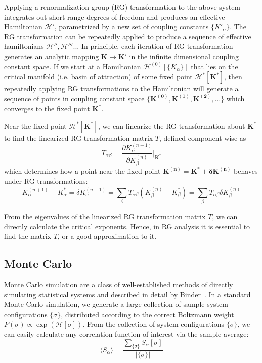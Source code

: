 \documentclass[12pt]{article}
\renewcommand{\vec}[1]{\mathbf{#1}}
\begin{document}
Applying a renormalization group (RG) transformation to the above system integrates out short range degrees of freedom and produces an effective Hamiltonian $\mathcal{H'}$, parametrized by a new set of coupling constants $\{K'_\alpha\}$. The RG transformation can be repeatedly applied to produce a sequence of effective hamiltonians $\mathcal{H''}, \mathcal{H'''} ...$ In principle, each iteration of RG transformation generates an analytic mapping $\vec{K}\mapsto\vec{K'}$ in the infinite dimensional coupling constant space. If we start at a Hamiltonian $\mathcal{H}^{(0)}[\{K_\alpha\}]$ that lies on the critical manifold (i.e. basin of attraction) of some fixed point $\mathcal{H^*}[\vec{K^*}]$, then repeatedly applying RG transformations to the Hamiltonian will generate a sequence of points in coupling constant space $\{\vec{K^{(0)}},\vec{K^{(1)}},\vec{K^{(2)}},...\}$  which converges to the fixed point $\vec{K^*}$. 

Near the fixed point $\mathcal{H^*}[\vec{K^*}]$, we can linearize the RG transformation about $\vec{K^*}$ to find the linearized RG transformation matrix $T$, defined component-wise as 
\begin{equation}
T_{\alpha\beta} = \frac{\partial K^{(n+1)}_\alpha}{\partial K^{(n)}_\beta} \Bigg|_{\vec{K^*}}
\end{equation}
which determines how a point near the fixed point $\vec{K^{(n)}} =\vec{K^*} + \vec{\delta K^{(n)}}$ behaves under RG transformations:
\begin{equation}
K^{(n+1)}_\alpha - K^*_\alpha = \delta K^{(n+1)}_\alpha = \sum_\beta T_{\alpha\beta}(K^{(n)}_\beta - K^*_\beta) = \sum_\beta T_{\alpha\beta}\delta K^{(n)}_\beta
\end{equation}

From the eigenvalues of the linearized RG transformation matrix $T$, we can directly calculate the critical exponents. Hence, in RG analysis it is essential to find the matrix $T$, or a good approximation to it. 

\subsection{Monte Carlo}
Monte Carlo simulation are a class of well-established methods of directly simulating statistical systems and described in detail by Binder~\cite{Binder2014}. In a standard Monte Carlo simulation, we generate a large collection of sample system configurations $\{\sigma\}$, distributed according to the correct Boltzmann weight $P(\sigma) \propto \exp(\mathcal{H}[\sigma])$. From the collection of system configurations $\{\sigma\}$, we can easily calculate any correlation function of interest via the sample average:
\begin{equation}
\langle S_\alpha \rangle = \frac{\sum_{\{\sigma\}} S_\alpha[\sigma]}{|\{\sigma\}|}
\end{equation}
\end{document}
